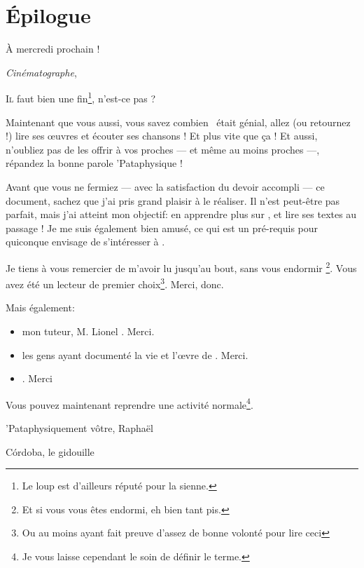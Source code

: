 \backmatter
\chapter{Épilogue}
\epigraph{À mercredi prochain !}
{\emph{Cinématographe}, \BV}
\vfill
\pagebreak

\lettrine{I}l faut bien une fin\footnote{Le loup est d'ailleurs réputé pour la sienne.},
n'est-ce pas ?

Maintenant que vous aussi, vous
savez combien \BV\ était génial, allez (ou retournez !) lire ses
\oe{}uvres et écouter ses chansons ! Et plus vite que ça !
Et aussi, n'oubliez pas de les offrir à vos proches --- et même
au moins proches ---, répandez la bonne parole 'Pataphysique !


Avant que vous ne fermiez --- avec la satisfaction du devoir accompli --- ce document,
sachez que j'ai pris grand plaisir à le réaliser. Il n'est peut-être pas parfait,
mais j'ai atteint mon objectif: en apprendre plus sur \BV, et lire ses textes
au passage ! Je me suis également bien amusé, ce qui est un pré-requis pour
quiconque envisage de s'intéresser à \BV.

Je tiens à vous remercier de m'avoir lu jusqu'au bout, sans vous endormir
\footnote{Et si vous vous êtes endormi, eh bien tant pis.}. Vous avez été
un lecteur de premier choix\footnote{Ou au moins ayant fait preuve d'assez de
bonne volonté pour lire ceci}. Merci, donc.

Mais également:
\begin{itemize}
\item mon tuteur, M. Lionel . Merci.
\item les gens ayant documenté la vie et l'\oe{}vre de \BV. Merci.
\item \BV. Merci
\end{itemize}

Vous pouvez maintenant reprendre une activité normale\footnote{Je vous laisse
cependant le soin de définir le terme.}.

\vfill
\hfill 'Pataphysiquement vôtre,
\vskip 2cm
\hfill Raphaël


\hfill Córdoba, le  gidouille 
\vskip 2cm

\tableofcontents

